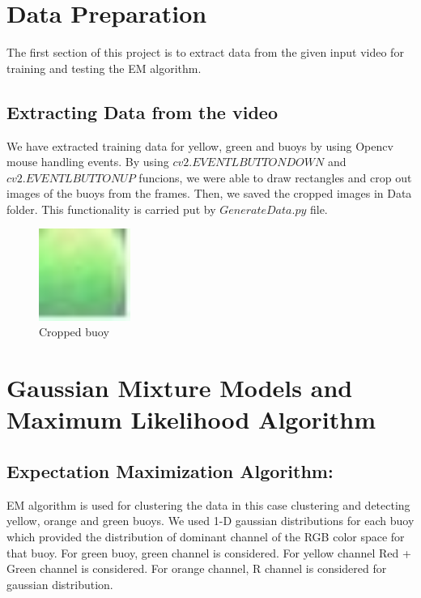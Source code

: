 \documentclass[12pt]{article}
\begin{document}
\section{Data Preparation} 
The first section of this project is to extract data from the given input video for training and testing the EM algorithm.

\subsection{Extracting Data from the video}
We have extracted training data for yellow, green and buoys by using Opencv mouse handling events. By using $cv2.EVENTLBUTTONDOWN$ and $cv2.EVENTLBUTTONUP$ funcions, we were able to draw rectangles and crop out images of the buoys from the frames. Then, we saved the cropped images in Data folder. This functionality is carried put by $GenerateData.py$ file.
\begin{figure}[h]
    \centering
    \includegraphics[width=3cm]{buoyimage}
    \caption{Cropped buoy}
    \label{fig:Cropped buoy for training data}
\end{figure}

\section{Gaussian Mixture Models and Maximum Likelihood Algorithm}
\subsection{Expectation Maximization Algorithm:}
EM algorithm is used for clustering the data in this case clustering and detecting yellow, orange and green buoys. We used 1-D gaussian distributions for each buoy which provided the distribution of dominant channel of the RGB color space for that buoy. For green buoy, green channel is considered. For yellow channel Red + Green channel is considered. For orange channel, R channel is considered for gaussian distribution.
\end{document}
